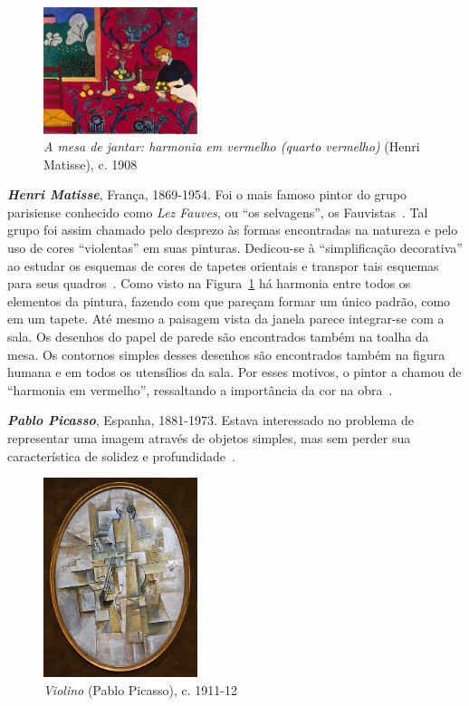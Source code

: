 \begin{figure}
  \begin{center}
    \includegraphics[width=0.4\textwidth]{figs/matisse_red.png}
  \end{center}
  \caption{\emph{A mesa de jantar: harmonia em vermelho (quarto vermelho)} (Henri Matisse), c. 1908}
  \label{fig:matisse:red}
\end{figure}

\textbf{\emph{Henri Matisse}}, França, 1869-1954. Foi o mais famoso
pintor do grupo parisiense conhecido como \textit{Lez Fauves}, ou ``os
selvagens'', os Fauvistas~\cite{elderfield,freeman}. Tal grupo foi
assim chamado pelo desprezo às formas encontradas na natureza e pelo
uso de cores ``violentas'' em suas pinturas. Dedicou-se à
``simplificação decorativa'' ao estudar os esquemas de cores de
tapetes orientais e transpor tais esquemas para seus
quadros~\cite{gombrich}. Como visto na Figura~\ref{fig:matisse:red} há
harmonia entre todos os elementos da pintura, fazendo com que pareçam
formar um único padrão, como em um tapete. Até mesmo a paisagem vista
da janela parece integrar-se com a sala. Os desenhos do papel de
parede são encontrados também na toalha da mesa. Os contornos simples
desses desenhos são encontrados também na figura humana e em todos os
utensílios da sala. Por esses motivos, o pintor a chamou de ``harmonia
em vermelho'', ressaltando a importância da cor na
obra~\cite{matisse}.

\textbf{\emph{Pablo Picasso}}, Espanha, 1881-1973. Estava interessado
no problema de representar uma imagem através de objetos simples, mas
sem perder sua característica de solidez e
profundidade~\cite{daix,gombrich}. 

\begin{figure}
  \begin{center}
    \includegraphics[width=0.4\textwidth]{figs/picasso_violino.png}
  \end{center}
  \caption{\emph{Violino} (Pablo Picasso), c. 1911-12}
  \label{fig:picasso:violino}
\end{figure}

